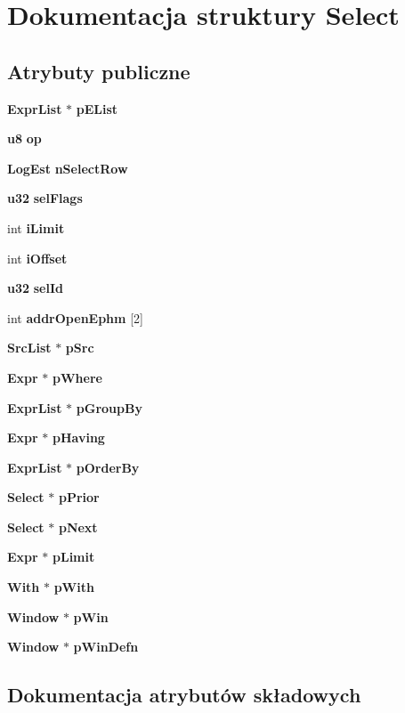 \section{Dokumentacja struktury Select}
\label{struct_select}
\subsection*{Atrybuty publiczne}
\begin{DoxyCompactItemize}
\item 
\textbf{ Expr\+List} $\ast$ \textbf{ p\+E\+List}
\item 
\textbf{ u8} \textbf{ op}
\item 
\textbf{ Log\+Est} \textbf{ n\+Select\+Row}
\item 
\textbf{ u32} \textbf{ sel\+Flags}
\item 
int \textbf{ i\+Limit}
\item 
int \textbf{ i\+Offset}
\item 
\textbf{ u32} \textbf{ sel\+Id}
\item 
int \textbf{ addr\+Open\+Ephm} [2]
\item 
\textbf{ Src\+List} $\ast$ \textbf{ p\+Src}
\item 
\textbf{ Expr} $\ast$ \textbf{ p\+Where}
\item 
\textbf{ Expr\+List} $\ast$ \textbf{ p\+Group\+By}
\item 
\textbf{ Expr} $\ast$ \textbf{ p\+Having}
\item 
\textbf{ Expr\+List} $\ast$ \textbf{ p\+Order\+By}
\item 
\textbf{ Select} $\ast$ \textbf{ p\+Prior}
\item 
\textbf{ Select} $\ast$ \textbf{ p\+Next}
\item 
\textbf{ Expr} $\ast$ \textbf{ p\+Limit}
\item 
\textbf{ With} $\ast$ \textbf{ p\+With}
\item 
\textbf{ Window} $\ast$ \textbf{ p\+Win}
\item 
\textbf{ Window} $\ast$ \textbf{ p\+Win\+Defn}
\end{DoxyCompactItemize}


\subsection{Dokumentacja atrybutów składowych}
\mbox{\label{struct_select_a7b55849c381b5452e42313aa7aa183ec}} 
